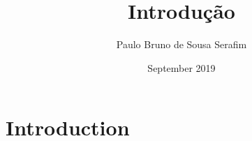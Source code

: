 \documentclass{article}
\title{Introdução}
\author{Paulo Bruno de Sousa Serafim}
\date{September 2019}
\begin{document}
\maketitle

\section{Introduction}
\end{document}
